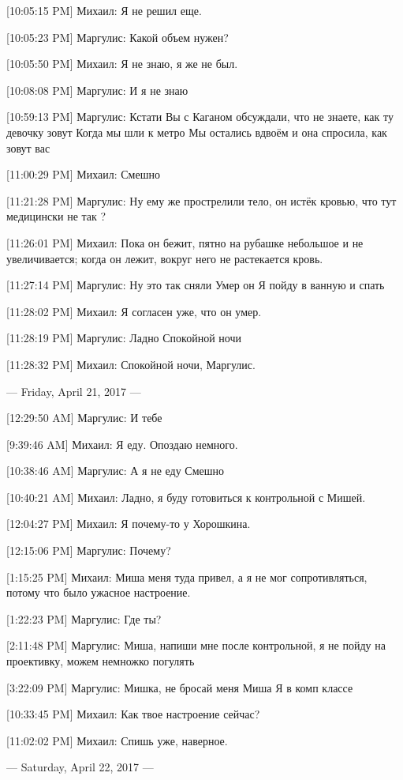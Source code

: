 \documentclass{article}
\begin{document}
[10:05:15 PM] Михаил:
Я не решил еще.

[10:05:23 PM] Маргулис:
Какой объем нужен?

[10:05:50 PM] Михаил:
Я не знаю, я же не был.

[10:08:08 PM] Маргулис:
И я не знаю

[10:59:13 PM] Маргулис:
Кстати
 Вы с Каганом обсуждали, что не знаете, как ту девочку зовут
 Когда мы шли к метро
 Мы остались вдвоём и она спросила, как зовут вас

[11:00:29 PM] Михаил:
Смешно

[11:21:28 PM] Маргулис:
Ну ему же прострелили тело, он истёк кровью, что тут медицински не так
 ?

[11:26:01 PM] Михаил:
Пока он бежит, пятно на рубашке небольшое и не увеличивается; когда он лежит, вокруг него не растекается кровь.

[11:27:14 PM] Маргулис:
Ну это так сняли
 Умер он
 Я пойду в ванную и спать

[11:28:02 PM] Михаил:
Я согласен уже, что он умер.

[11:28:19 PM] Маргулис:
Ладно
 Спокойной ночи

[11:28:32 PM] Михаил:
Спокойной ночи, Маргулис.

--- Friday, April 21, 2017 ---

[12:29:50 AM] Маргулис:
И тебе

[9:39:46 AM] Михаил:
Я еду. Опоздаю немного.

[10:38:46 AM] Маргулис:
А я не еду
 Смешно

[10:40:21 AM] Михаил:
Ладно, я буду готовиться к контрольной с Мишей.

[12:04:27 PM] Михаил:
Я почему-то у Хорошкина.

[12:15:06 PM] Маргулис:
Почему?

[1:15:25 PM] Михаил:
Миша меня туда привел, а я не мог сопротивляться, потому что было ужасное настроение.

[1:22:23 PM] Маргулис:
Где ты?

[2:11:48 PM] Маргулис:
Миша, напиши мне после контрольной, я не пойду на проективку, можем немножко погулять

[3:22:09 PM] Маргулис:
Мишка, не бросай меня
 Миша
 Я в комп классе

[10:33:45 PM] Михаил:
Как твое настроение сейчас?

[11:02:02 PM] Михаил:
Спишь уже, наверное.

--- Saturday, April 22, 2017 ---
\end{document}
